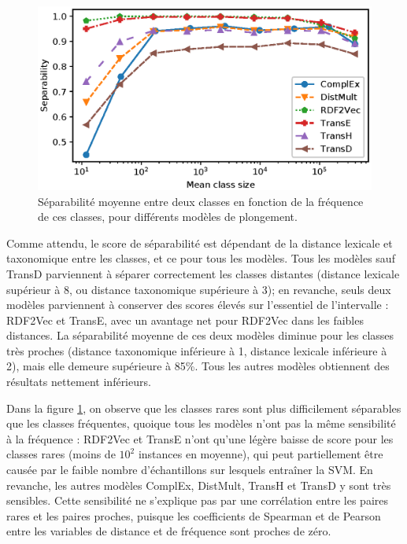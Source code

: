 \begin{figure}[h]
  \centering
  \includegraphics[width=\linewidth]{fig/plot/separability2_type1.eps}
  \caption{Séparabilité moyenne entre deux classes en fonction de la fréquence de ces classes, pour différents modèles de plongement.}
  \label{fig:separability-freq}
\end{figure}

Comme attendu, le score de séparabilité est dépendant de la distance lexicale et taxonomique entre les classes, et ce pour tous les modèles. Tous les modèles sauf TransD parviennent à séparer correctement les classes distantes (distance lexicale supérieur à 8, ou distance taxonomique supérieure à 3); en revanche, seuls deux modèles parviennent à conserver des scores élevés sur l'essentiel de l'intervalle : RDF2Vec et TransE, avec un avantage net pour RDF2Vec dans les faibles distances. La séparabilité moyenne de ces deux modèles diminue pour les classes très proches (distance taxonomique inférieure à 1, distance lexicale inférieure à 2), mais elle demeure supérieure à 85\%. Tous les autres modèles obtiennent des résultats nettement inférieurs.

Dans la figure \ref{fig:separability-freq}, on observe que les classes rares sont plus difficilement séparables que les classes fréquentes, quoique tous les modèles n'ont pas la même sensibilité à la fréquence : RDF2Vec et TransE n'ont qu'une légère baisse de score pour les classes rares (moins de $10^2$ instances en moyenne), qui peut partiellement être causée par le faible nombre d'échantillons sur lesquels entraîner la SVM. En revanche, les autres modèles ComplEx, DistMult, TransH et TransD y sont très sensibles. Cette sensibilité ne s'explique pas par une corrélation entre les paires rares et les paires proches, puisque les coefficients de Spearman et de Pearson entre les variables de distance et de fréquence sont proches de zéro.

